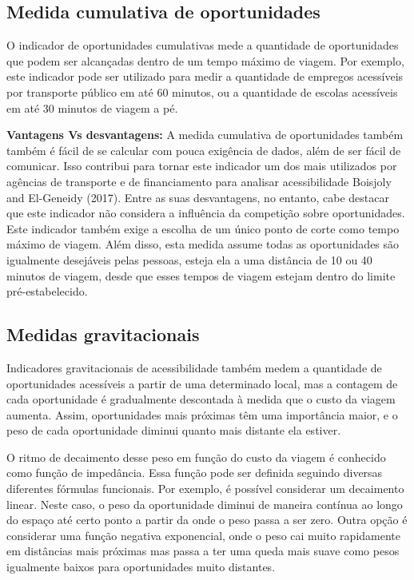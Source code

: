 \documentclass[
  letterpaper,
  DIV=11,
  numbers=noendperiod]{scrreprt}
\begin{document}
\hypertarget{medida-cumulativa-de-oportunidades}{%
\subsection{Medida cumulativa de
oportunidades}\label{medida-cumulativa-de-oportunidades}}

O indicador de oportunidades cumulativas mede a quantidade de
oportunidades que podem ser alcançadas dentro de um tempo máximo de
viagem. Por exemplo, este indicador pode ser utilizado para medir a
quantidade de empregos acessíveis por transporte público em até 60
minutos, ou a quantidade de escolas acessíveis em até 30 minutos de
viagem a pé.

\textbf{Vantagens Vs desvantagens:} A medida cumulativa de oportunidades
também também é fácil de se calcular com pouca exigência de dados, além
de ser fácil de comunicar. Isso contribui para tornar este indicador um
dos mais utilizados por agências de transporte e de financiamento para
analisar acessibilidade Boisjoly and El-Geneidy (2017). Entre as suas
desvantagens, no entanto, cabe destacar que este indicador não considera
a influência da competição sobre oportunidades. Este indicador também
exige a escolha de um único ponto de corte como tempo máximo de viagem.
Além disso, esta medida assume todas as oportunidades são igualmente
desejáveis pelas pessoas, esteja ela a uma distância de 10 ou 40 minutos
de viagem, desde que esses tempos de viagem estejam dentro do limite
pré-estabelecido.

\hypertarget{medidas-gravitacionais}{%
\subsection{Medidas gravitacionais}\label{medidas-gravitacionais}}

Indicadores gravitacionais de acessibilidade também medem a quantidade
de oportunidades acessíveis a partir de uma determinado local, mas a
contagem de cada oportunidade é gradualmente descontada à medida que o
custo da viagem aumenta. Assim, oportunidades mais próximas têm uma
importância maior, e o peso de cada oportunidade diminui quanto mais
distante ela estiver.

O ritmo de decaimento desse peso em função do custo da viagem é
conhecido como função de impedância. Essa função pode ser definida
seguindo diversas diferentes fórmulas funcionais. Por exemplo, é
possível considerar um decaimento linear. Neste caso, o peso da
oportunidade diminui de maneira contínua ao longo do espaço até certo
ponto a partir da onde o peso passa a ser zero. Outra opção é considerar
uma função negativa exponencial, onde o peso cai muito rapidamente em
distâncias mais próximas mas passa a ter uma queda mais suave como pesos
igualmente baixos para oportunidades muito distantes.
\end{document}
